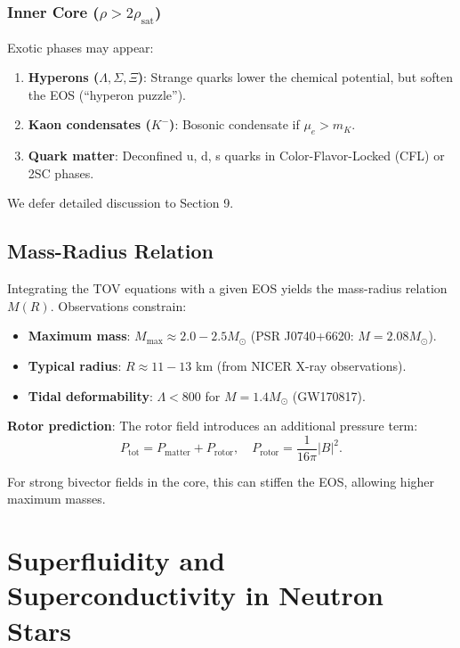 \documentclass[12pt,a4paper]{article}
\theoremstyle{definition}
\theoremstyle{remark}
\begin{document}
\subsubsection{Inner Core ($\rho > 2\rho_{\text{sat}}$)}

Exotic phases may appear:
\begin{enumerate}
\item \textbf{Hyperons ($\Lambda, \Sigma, \Xi$)}: Strange quarks lower the chemical potential, but soften the EOS (``hyperon puzzle'').
\item \textbf{Kaon condensates ($K^-$)}: Bosonic condensate if $\mu_e > m_K$.
\item \textbf{Quark matter}: Deconfined u, d, s quarks in Color-Flavor-Locked (CFL) or 2SC phases.
\end{enumerate}

We defer detailed discussion to Section 9.

\subsection{Mass-Radius Relation}

Integrating the TOV equations with a given EOS yields the mass-radius relation $M(R)$. Observations constrain:

\begin{itemize}
\item \textbf{Maximum mass}: $M_{\text{max}} \approx 2.0-2.5 M_\odot$ (PSR J0740+6620: $M = 2.08 M_\odot$).
\item \textbf{Typical radius}: $R \approx 11-13$ km (from NICER X-ray observations).
\item \textbf{Tidal deformability}: $\Lambda < 800$ for $M = 1.4 M_\odot$ (GW170817).
\end{itemize}

\textbf{Rotor prediction}: The rotor field introduces an additional pressure term:
\begin{equation}
P_{\text{tot}} = P_{\text{matter}} + P_{\text{rotor}}, \quad P_{\text{rotor}} = \frac{1}{16\pi} |B|^2.
\end{equation}

For strong bivector fields in the core, this can stiffen the EOS, allowing higher maximum masses.

\section{Superfluidity and Superconductivity in Neutron Stars}
\end{document}

